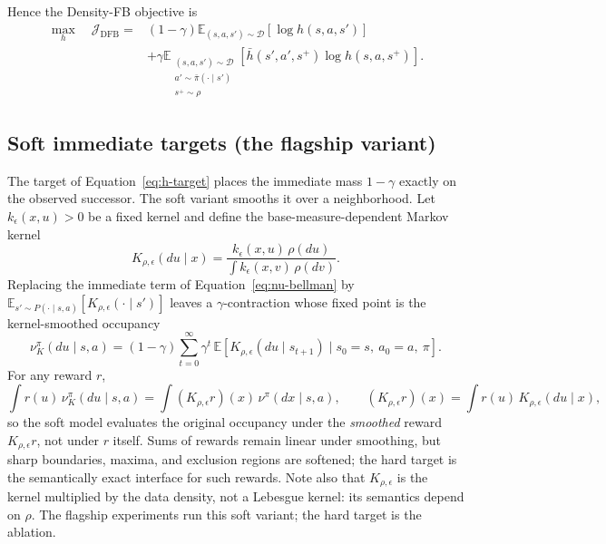 \documentclass[11pt]{article}
\begin{document}
Hence the Density-FB objective is
\begin{equation}
\label{eq:dfb-population}
\boxed{
\begin{aligned}
    \max_h\quad \mathcal J_{\mathrm{DFB}} ={}& (1-\gamma) \mathbb E_{(s,a,s')\sim\mathcal D} \left[ \log h(s,a,s') \right] \\
                                            &+ \gamma \mathbb E_{\substack{ (s,a,s')\sim\mathcal D\\ a'\sim\bar\pi(\cdot\mid s')\\ s^+\sim\rho }}
                                                \left[ \bar h(s',a',s^+) \log h(s,a,s^+) \right].
\end{aligned}
}
\end{equation}

{\color{addgreen}
\subsection*{Soft immediate targets (the flagship variant)}

The target of Equation~\eqref{eq:h-target} places the immediate mass $1-\gamma$ exactly on the observed successor.
The soft variant smooths it over a neighborhood.
Let $k_\epsilon(x,u)>0$ be a fixed kernel and define the base-measure-dependent Markov kernel
\begin{equation}
    K_{\rho,\epsilon}(du\mid x)
    =
    \frac{k_\epsilon(x,u)\,\rho(du)}{\int k_\epsilon(x,v)\,\rho(dv)}.
\label{eq:soft-kernel}
\end{equation}
Replacing the immediate term of Equation~\eqref{eq:nu-bellman} by
$\mathbb E_{s'\sim P(\cdot\mid s,a)}\left[K_{\rho,\epsilon}(\cdot\mid s')\right]$
leaves a $\gamma$-contraction whose fixed point is the kernel-smoothed occupancy
\begin{equation}
    \nu_K^\pi(du\mid s,a)
    =
    (1-\gamma)\sum_{t=0}^{\infty}\gamma^t\,
    \mathbb E\left[ K_{\rho,\epsilon}(du\mid s_{t+1}) \mid s_0=s,\ a_0=a,\ \pi \right].
\label{eq:soft-fixed-point}
\end{equation}
For any reward $r$,
\begin{equation}
    \int r(u)\, \nu_K^\pi(du\mid s,a)
    =
    \int (K_{\rho,\epsilon} r)(x)\, \nu^\pi(dx\mid s,a),
    \qquad
    (K_{\rho,\epsilon} r)(x) = \int r(u)\, K_{\rho,\epsilon}(du\mid x),
\label{eq:soft-smoothed-reward}
\end{equation}
so the soft model evaluates the original occupancy under the \emph{smoothed} reward $K_{\rho,\epsilon}r$, not under $r$ itself.
Sums of rewards remain linear under smoothing, but sharp boundaries, maxima, and exclusion regions are softened; the hard target is the semantically exact interface for such rewards.
Note also that $K_{\rho,\epsilon}$ is the kernel multiplied by the data density, not a Lebesgue kernel: its semantics depend on $\rho$.
The flagship experiments run this soft variant; the hard target is the ablation.
}
\end{document}

